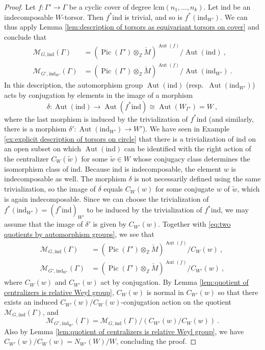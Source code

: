 \documentclass[10pt, a4paper]{amsart}
\theoremstyle{definition}
\theoremstyle{myitemstyle}
\newcommand{\Z}{\mathbb{Z}}
\newcommand{\Mcheck}{{\check{M}}}
\newcommand{\mc}[1]{{\mathcal{#1}}}
\DeclareMathOperator{\Pic}{Pic}
\DeclareMathOperator{\Aut}{Aut}
\newcommand{\ind}{\mathrm{ind}}
\begin{document}
\begin{proof}
Let $f\colon \Gamma'\to \Gamma$ be a cyclic cover of degree $\mathrm{lcm}(n_1,\ldots,n_k)$. Let $\ind$ be an indecomposable $W$-torsor. Then $f^*\ind$ is trivial, and so is $f^*(\ind_{W'})$. We can thus apply Lemma \ref{lem:description of torsors as equivariant torsors on cover} and conclude that
\begin{equation}\begin{split}
\label{eq:two quotients by automorphism groups}
    \mc M_{G,\ind}(\Gamma)&= (\Pic(\Gamma')\otimes_\Z \Mcheck)^{\Aut(f)}/\Aut(\ind) \ ,\\
    \mc M_{G',\ind_{W'}}(\Gamma)&= (\Pic(\Gamma')\otimes_\Z \Mcheck)^{\Aut(f)}/\Aut(\ind_{W'}) \ .
\end{split}\end{equation}
In this description, the automorphism group $\Aut(\ind)$ (resp.\ $\Aut(\ind_{W'})$) acts by conjugation by elements in the image of a morphism 
\[
    \delta\colon\Aut(\ind)\to \Aut(f^*\ind)\cong \Aut(W_{\Gamma'})=W \ ,
\]
where the last morphism is induced by the trivialization of $f^*\ind$ (and similarly, there is a morphism $\delta'\colon \Aut(\ind_{W'})\to W'$). We have seen in Example \ref{ex:explicit description of torsors on circle} that there is a trivialization of $\ind$ on an open subset on which $\Aut(\ind)$ can be identified with the right action of the centralizer $C_W(\widetilde w)$ for some $\widetilde w\in W$ whose conjugacy class determines the isomorphism class of $\ind$. Because $\ind$ is indecomposable, the element $w$ is indecomposable as well. The morphism $\delta$ is not necessarily defined using the same trivialization, so the image of $\delta$ equals $C_W(w)$ for some conjugate $w$ of $\widetilde w$, which is again indecomposable. Since we can choose the trivialization of $f^*(\ind_{W'})=(f^*\ind)_{W'}$ to be induced by the trivialization of $f^*\ind$, we may assume that the image of $\delta'$ is given by $C_{W'}(w)$. Together with \eqref{eq:two quotients by automorphism groups}, we see that 
\begin{align*}
    \mc M_{G,\ind}(\Gamma)&= (\Pic(\Gamma')\otimes_\Z \Mcheck)^{\Aut(f)}/C_{W}(w) \ ,\\
    \mc M_{G',\ind_{W'}}(\Gamma)&= (\Pic(\Gamma')\otimes_\Z \Mcheck)^{\Aut(f)}/C_{W'}(w) \ ,
\end{align*}
where $C_W(w)$ and $C_{W'}(w)$ act by conjugation. By Lemma \ref{lem:quotient of centralizers is relative Weyl group}, $C_W(w)$ is normal in $C_{W'}(w)$ so that there exists an induced $C_{W'}(w)/C_W(w)$-conjugation action on the quotient $\mc M_{G,\ind}(\Gamma)$, and 
\[
    \mc M_{G',\ind_{W'}}(\Gamma)=\mc M_{G,\ind}(\Gamma)/(C_{W'}(w)/C_W(w)) \ .
\]
Also by Lemma \ref{lem:quotient of centralizers is relative Weyl group}, we have $C_{W'}(w)/C_W(w)=N_{W'}(W)/W$, concluding the proof.
\end{proof}
\end{document}
